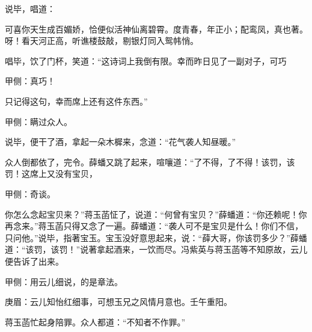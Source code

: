 \begin{parag}
    说毕，唱道：
\end{parag}

\begin{qute2sp}
    \begin{poem}
        \begin{pl}可喜你天生成百媚娇，恰便似活神仙离碧霄。度青春，年正小；配鸾凤，真也著。呀！看天河正高，听谯楼鼓敲，剔银灯同入鸳帏悄。\end{pl}
    \end{poem}
\end{qute2sp}


\begin{parag}
    唱毕，饮了门杯，笑道：“这诗词上我倒有限。幸而昨日见了一副对子，可巧\begin{note}甲侧：真巧！\end{note}只记得这句，幸而席上还有这件东西。”\begin{note}甲侧：瞒过众人。\end{note}说毕，便干了酒，拿起一朵木樨来，念道：“花气袭人知昼暖。”
\end{parag}


\begin{parag}
    众人倒都依了，完令。薛蟠又跳了起来，喧嚷道：“了不得，了不得！该罚，该罚！这席上又没有宝贝，\begin{note}甲侧：奇谈。\end{note}你怎么念起宝贝来？”蒋玉菡怔了，说道：“何曾有宝贝？”薛蟠道：“你还赖呢！你再念来。”蒋玉菡只得又念了一遍。薛蟠道：“袭人可不是宝贝是什么！你们不信，只问他。”说毕，指著宝玉。宝玉没好意思起来，说：“薛大哥，你该罚多少？”薛蟠道：“该罚，该罚！”说著拿起酒来，一饮而尽。冯紫英与蒋玉菡等不知原故，云儿便告诉了出来。\begin{note}甲侧：用云儿细说，的是章法。\end{note}\begin{note}庚眉：云儿知怡红细事，可想玉兄之风情月意也。壬午重阳。\end{note}蒋玉菡忙起身陪罪。众人都道：“不知者不作罪。”
\end{parag}


